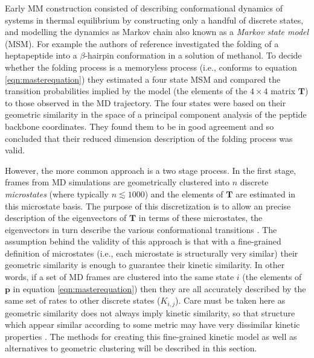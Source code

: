 Early MM construction consisted of describing conformational dynamics of systems in thermal equilibrium by constructing only a handful of discrete states, and modelling the dynamics as Markov chain also known as a \emph{Markov state model} (MSM). For example the authors of reference \cite{degrootEssentialDynamicsReversible2001} investigated the folding of a heptapeptide into a $\beta$-hairpin conformation in a solution of methanol.  To decide whether the folding process is a memoryless process (i.e., conforms to equation \ref{eqn:masterequation}) they estimated a four state MSM and compared the transition probabilities implied by the model (the elements of the $4\times 4$ matrix $\mathbf{T}$) to those observed in the MD trajectory. The four states were based on their geometric similarity in the space of a principal component analysis of the peptide backbone coordinates. They found them to be in good agreement and so concluded that their reduced dimension description of the folding process was valid. 

However, the more common approach \cite{husicMarkovStateModels2018, noeMarkovModelsMolecular2019b} is a two stage process. In the first stage, frames from MD simulations are  geometrically clustered into $n$ discrete \emph{microstates} (where typically $n \lesssim 1000$) and the elements of $\mathbf{T}$ are estimated in this microstate basis. The purpose of this discretization is to allow an precise description of the eigenvectors of $\mathbf{T}$ in terms of these microstates, the eigenvectors in turn describe the various conformational transitions \cite{perez-hernandezIdentificationSlowMolecular2013a}. The assumption behind the validity of this approach is that with a fine-grained definition of microstates (i.e., each microstate is structurally very similar) their geometric similarity is enough to guarantee their kinetic similarity.  In other words, if a set of MD frames are clustered into the same state $i$ (the elements of $\mathbf{p}$ in equation \ref{eqn:masterequation}) then they are all accurately described by the same set of rates to other discrete states ($K_{i, j}$). Care must be taken here as geometric similarity does not always imply kinetic similarity, so that structure which appear similar according to some metric may have very dissimilar kinetic properties \cite{bowmanUsingGeneralizedEnsemble2009a, krivovHiddenComplexityFree2004, noeTransitionNetworksModeling2008, berezovskaAccountingKineticsOrder2012}. The methods for creating this fine-grained kinetic model as well as alternatives to geometric clustering will be described in this section.

